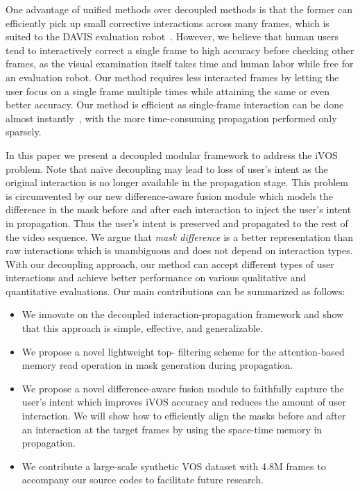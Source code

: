 \documentclass[final]{cvpr}
\begin{document}
	One advantage of unified methods over decoupled methods is that the former can efficiently pick up small corrective interactions across many frames, which is suited to the DAVIS evaluation robot~\cite{Caelles_arXiv_2018}. 
	However, we believe that human users tend to interactively correct a single frame to high accuracy before checking other frames, as the visual examination itself takes time and human labor while free for an evaluation robot. 
	Our method requires less interacted frames by letting the user focus on a single frame multiple times while attaining the same or even better accuracy. Our method is efficient as single-frame interaction can be done almost instantly~\cite{sofiiuk2020fbrs}, with the more time-consuming propagation performed only sparsely.
	
	In this paper we present a decoupled modular framework to address the iVOS problem. Note that na\"ive decoupling may lead to loss of user's intent as the original interaction is no longer available in the propagation stage. This problem is circumvented by our new difference-aware fusion module which models the difference in the mask before and after each interaction to inject the user's intent in propagation. Thus
the user's intent is preserved and propagated to the rest of the video sequence.
	We argue that  \emph{mask difference} is a better representation than raw interactions which is unambiguous and does not depend on interaction types. With our decoupling approach, our method can accept different types of user interactions and achieve better performance on various qualitative and quantitative evaluations.
	Our main contributions can be summarized as follows:
	\begin{itemize}
		\vspace{-5pt}
		\item We innovate on the decoupled interaction-propagation framework and show that this approach is simple, effective, and generalizable.
		\vspace{-5pt}
		\item 
		We propose a novel lightweight top- filtering scheme for the attention-based memory read operation in mask generation during propagation.
		\vspace{-5pt}
		\item We propose a novel difference-aware fusion module to faithfully capture the user's intent which improves iVOS accuracy and reduces the amount of user interaction. 
		We will show how to efficiently align the masks before and after an  interaction  at the target frames by using the space-time memory in propagation.
		\vspace{-5pt}
		\item We contribute a large-scale synthetic VOS dataset with 4.8M frames to accompany our source codes to facilitate future research.
	\end{itemize}
	
\end{document}
